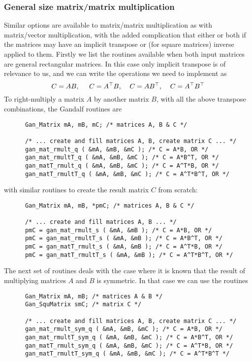 \subsubsection{General size matrix/matrix multiplication}
Similar options are available to matrix/matrix multiplication as with
matrix/vector multiplication, with the added complication that either or
both if the matrices may have an implicit transpose or (for square matrices)
inverse applied to them. Firstly we list the routines available when
both input matrices are general rectangular matrices. In this case only
implicit transpose is of relevance to us, and we can write the operations
we need to implement as
\[ C = A B,\;\;\;\;\;C = A^{\top} B,\;\;\;\;C = A B^{\top},\;\;\;\;C = A^{\top} B^{\top}
\]
To right-multiply a matrix $A$ by another matrix $B$, with all the above
transpose combinations, the Gandalf routines are
\begin{verbatim}
      Gan_Matrix mA, mB, mC; /* matrices A, B & C */

      /* ... create and fill matrices A, B, create matrix C ... */
      gan_mat_rmult_q ( &mA, &mB, &mC ); /* C = A*B, OR */
      gan_mat_rmultT_q ( &mA, &mB, &mC ); /* C = A*B^T, OR */
      gan_matT_rmult_q ( &mA, &mB, &mC ); /* C = A^T*B, OR */
      gan_matT_rmultT_q ( &mA, &mB, &mC ); /* C = A^T*B^T, OR */
\end{verbatim}
with similar routines to create the result matrix $C$ from scratch:
\begin{verbatim}
      Gan_Matrix mA, mB, *pmC; /* matrices A, B & C */

      /* ... create and fill matrices A, B ... */
      pmC = gan_mat_rmult_s ( &mA, &mB ); /* C = A*B, OR */
      pmC = gan_mat_rmultT_s ( &mA, &mB ); /* C = A*B^T, OR */
      pmC = gan_matT_rmult_s ( &mA, &mB ); /* C = A^T*B, OR */
      pmC = gan_matT_rmultT_s ( &mA, &mB ); /* C = A^T*B^T, OR */
\end{verbatim}
The next set of routines deals with the case where it is known that the
result of multiplying matrices $A$ and $B$ is symmetric. In that case we
can use the routines
\begin{verbatim}
      Gan_Matrix mA, mB; /* matrices A & B */
      Gan_SquMatrix smC; /* matrix C */

      /* ... create and fill matrices A, B, create matrix C ... */
      gan_mat_rmult_sym_q ( &mA, &mB, &mC ); /* C = A*B, OR */
      gan_mat_rmultT_sym_q ( &mA, &mB, &mC ); /* C = A*B^T, OR */
      gan_matT_rmult_sym_q ( &mA, &mB, &mC ); /* C = A^T*B, OR */
      gan_matT_rmultT_sym_q ( &mA, &mB, &mC ); /* C = A^T*B^T */
\end{verbatim}
